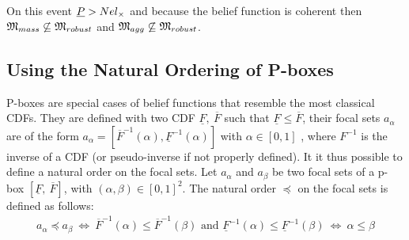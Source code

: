 \begin{example}
    On this event $\underline{P}>Nel_\times$ and because the belief function is coherent then $\mathfrak{M}_{mass}\not\subseteq\mathfrak{M}_{robust}$ and $\mathfrak{M}_{agg}\not\subseteq\mathfrak{M}_{robust}$.
\end{example}

\subsection{Using the Natural Ordering of P-boxes}\label{subsec:pboxes}
P-boxes are special cases of belief functions that resemble the most classical CDFs. They are defined with two CDF $\underline{F},~\overline{F}$ such that $\underline{F}\leqslant\overline{F}$, their focal sets $a_\alpha$ are of the form $a_\alpha=[\overline{F}^{-1}(\alpha), \underline{F}^{-1}(\alpha)]$ with $\alpha\in[0,1]$ \cite{destercke_unifying_2008}, where $F^{-1}$ is the inverse of a CDF (or pseudo-inverse if not properly defined). It it thus possible to define a natural order on the focal sets. Let $a_\alpha$ and $a_\beta$ be two focal sets of a p-box $[\underline{F},~\overline{F}]$, with $(\alpha,\beta)\in[0,1]^2$. The natural order $\preceq$ on the focal sets is defined as follows:
\begin{align}
    a_\alpha\preceq a_\beta ~\Leftrightarrow~ \overline{F}^{-1}(\alpha)\leqslant\overline{F}^{-1}(\beta) \text{ and } \underline{F}^{-1}(\alpha)\leqslant\underline{F}^{-1}(\beta)~\Leftrightarrow~ \alpha\leqslant\beta\label{eq:order_pbox}
\end{align}


